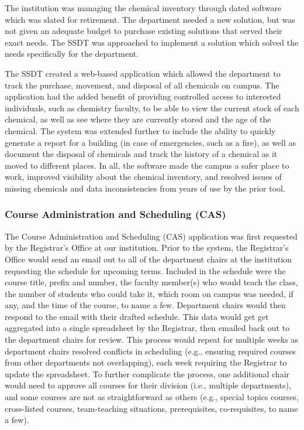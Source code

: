 The institution was managing the chemical inventory through dated software which was slated for retirement. The department needed a new solution, but was not given an adequate budget to purchase existing solutions that served their exact needs. The SSDT was approached to implement a solution which solved the needs specifically for the department.

The SSDT created a web-based application which allowed the department to track the purchase, movement, and disposal of all chemicals on campus. The application had the added benefit of providing controlled access to interested individuals, such as chemistry faculty, to be able to view the current stock of each chemical, as well as see where they are currently stored and the age of the chemical. The system was extended further to include the ability to quickly generate a report for a building (in case of emergencies, such as a fire), as well as document the disposal of chemicals and track the history of a chemical as it moved to different places. In all, the software made the campus a safer place to work, improved visibility about the chemical inventory, and resolved issues of missing chemicals and data inconsistencies from years of use by the prior tool.

\subsubsection{Course Administration and Scheduling (CAS)}
The Course Administration and Scheduling (CAS) application was first requested by the Registrar's Office at our institution. Prior to the system, the Registrar's Office would send an email out to all of the department chairs at the institution requesting the schedule for upcoming terms. Included in the schedule were the course title, prefix and number, the faculty member(s) who would teach the class, the number of students who could take it, which room on campus was needed, if any, and the time of the course, to name a few. Department chairs would then respond to the email with their drafted schedule. This data would get get aggregated into a single spreadsheet by the Registrar, then emailed back out to the department chairs for review. This process would repeat for multiple weeks as department chairs resolved conflicts in scheduling (e.g., ensuring required courses from other departments not overlapping), each week requiring the Registrar to update the spreadsheet. To further complicate the process, one additional chair would need to approve all courses for their division (i.e., multiple departments), and some courses are not as straightforward as others (e.g., special topics courses, cross-listed courses, team-teaching situations, prerequisites, co-requisites, to name a few).

